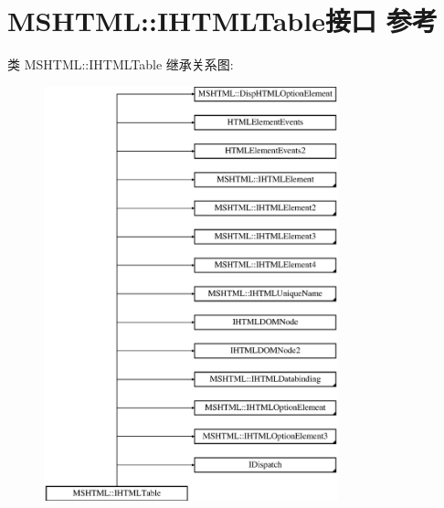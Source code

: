 \hypertarget{interface_m_s_h_t_m_l_1_1_i_h_t_m_l_table}{}\section{M\+S\+H\+T\+ML\+:\+:I\+H\+T\+M\+L\+Table接口 参考}
\label{interface_m_s_h_t_m_l_1_1_i_h_t_m_l_table}
类 M\+S\+H\+T\+ML\+:\+:I\+H\+T\+M\+L\+Table 继承关系图\+:\begin{figure}[H]
\begin{center}
\leavevmode
\includegraphics[height=12.000000cm]{interface_m_s_h_t_m_l_1_1_i_h_t_m_l_table}
\end{center}
\end{figure}
